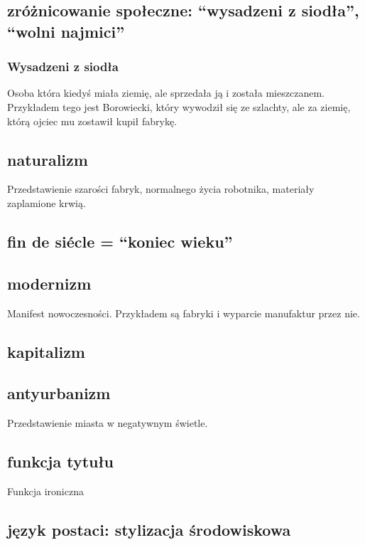 \documentclass[a4paper]{article}
\begin{document}
\subsection*{zróżnicowanie społeczne: ``wysadzeni z siodła'', ``wolni najmici''}
\subsubsection*{Wysadzeni z siodła}
Osoba która kiedyś miała ziemię, ale sprzedała ją i została mieszczanem.
Przy\-kładem tego jest Borowiecki, który wywodził się ze szlachty, ale za ziemię,
którą ojciec mu zostawił kupił fabrykę.
\subsection*{naturalizm}
Przedstawienie szarości fabryk, normalnego życia robotnika, materiały zapla\-mione krwią.
\subsection*{fin de si\'ecle = ``koniec wieku''}
\subsection*{modernizm}
Manifest nowoczesności. Przykładem są fabryki i wyparcie manufaktur przez nie.
\subsection*{kapitalizm}
\subsection*{antyurbanizm}
Przedstawienie miasta w negatywnym świetle.
\subsection*{funkcja tytułu}
Funkcja ironiczna
\subsection*{język postaci: stylizacja środowiskowa}
\end{document}

